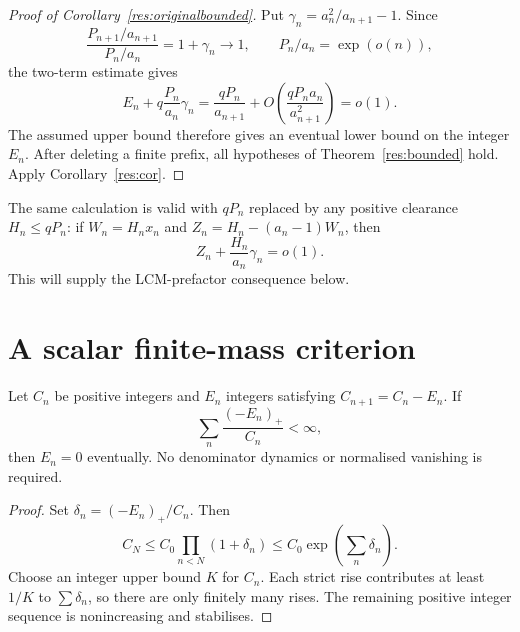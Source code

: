 \documentclass[11pt]{article}
\begin{document}
\begin{proof}[Proof of Corollary~\ref{res:originalbounded}]
Put $\gamma_n=a_n^2/a_{n+1}-1$. Since
\[
 \frac{P_{n+1}/a_{n+1}}{P_n/a_n}=1+\gamma_n\longrightarrow1,
 \qquad P_n/a_n=\exp(o(n)),
\]
the two-term estimate gives
\begin{equation}\label{eq:canonical-dictionary}
 E_n+q\frac{P_n}{a_n}\gamma_n
 =\frac{qP_n}{a_{n+1}}+
 O\!\left(\frac{qP_na_n}{a_{n+1}^2}\right)=o(1).
\end{equation}
The assumed upper bound therefore gives an eventual lower bound on the
integer $E_n$. After deleting a finite prefix, all hypotheses of
Theorem~\ref{res:bounded} hold. Apply Corollary~\ref{res:cor}.
\end{proof}

The same calculation is valid with $qP_n$ replaced by any positive
clearance $H_n\le qP_n$: if $W_n=H_nx_n$ and
$Z_n=H_n-(a_n-1)W_n$, then
\begin{equation}\label{eq:general-clearance-dictionary}
 Z_n+\frac{H_n}{a_n}\gamma_n=o(1).
\end{equation}
This will supply the LCM-prefactor consequence below.

\section{A scalar finite-mass criterion}\label{sec:mass}
\begin{theorem}\label{res:massscalar}\label{res:mass}
Let $C_n$ be positive integers and $E_n$ integers satisfying
$C_{n+1}=C_n-E_n$. If
\[
 \sum_n\frac{(-E_n)_+}{C_n}<\infty,
\]
then $E_n=0$ eventually. No denominator dynamics or normalised vanishing
is required.
\end{theorem}
\begin{proof}
Set $\delta_n=(-E_n)_+/C_n$. Then
\[
 C_N\le C_0\prod_{n<N}(1+\delta_n)
 \le C_0\exp\!\left(\sum_n\delta_n\right).
\]
Choose an integer upper bound $K$ for $C_n$. Each strict rise contributes
at least $1/K$ to $\sum\delta_n$, so there are only finitely many rises.
The remaining positive integer sequence is nonincreasing and stabilises.
\end{proof}
\end{document}
